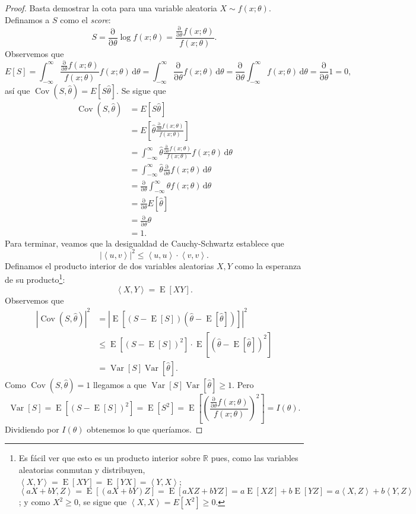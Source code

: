 \documentclass[11pt,letterpaper]{article}
\newcommand{\dif}{\ensuremath{\,\mathrm{d}}}
\newcommand{\pderivative}[2]{\ensuremath{\frac{\mathrm{\partial}#2}{\mathrm{\partial}#1}}}
\newcommand{\dotproduct}[2]{\ensuremath{\left\langle#1,#2\right\rangle}}
\newcommand{\expected}{\ensuremath{\operatorname{E}}}
\newcommand{\variance}{\ensuremath{\operatorname{Var}}}
\newcommand{\covariance}{\ensuremath{\operatorname{Cov}}}
\theoremstyle{definition}
\theoremstyle{theorem}
\theoremstyle{remark}
\begin{document}
	\begin{proof}
		Basta demostrar la cota para una variable aleatoria \(X\sim f(x;\theta)\). Definamos a \(S\) como el \textit{score}:
		\[S=\pderivative{\theta}{}\log f(x;\theta)=\frac{\pderivative{\theta}{}f(x;\theta)}{f(x;\theta)}.\]
		Observemos que
		\[E[S]=\int_{-\infty}^{\infty}\frac{\pderivative{\theta}{}f(x;\theta)}{f(x;\theta)}f(x;\theta)\dif\theta=\int_{-\infty}^{\infty}\pderivative{\theta}{}f(x;\theta)\dif\theta=\pderivative{\theta}{}\int_{-\infty}^{\infty}f(x;\theta)\dif\theta=\pderivative{\theta}{}1=0,\]
		así que \(\covariance(S,\hat{\theta})=E[S\hat{\theta}]\). Se sigue que
		\begin{align*}
			\covariance(S,\hat{\theta})&=E[S\hat{\theta}] \\
			&=E\left[\hat{\theta}\frac{\pderivative{\theta}{}f(x;\theta)}{f(x;\theta)}\right] \\
			&=\int_{-\infty}^{\infty}\hat{\theta}\frac{\pderivative{\theta}{}f(x;\theta)}{f(x;\theta)}f(x;\theta)\dif\theta \\
			&=\int_{-\infty}^{\infty}\hat{\theta}\pderivative{\theta}{}f(x;\theta)\dif\theta \\
			&=\pderivative{\theta}{}\int_{-\infty}^{\infty}\theta f(x;\theta)\dif\theta \\
			&=\pderivative{\theta}{}E[\hat{\theta}] \\
			&=\pderivative{\theta}{}\theta \\
			&=1.
		\end{align*}
		Para terminar, veamos que la desigualdad de Cauchy-Schwartz establece que
		\[|\dotproduct{u}{v}|^2\leq\dotproduct{u}{u}\cdot\dotproduct{v}{v}.\]
		Definamos el producto interior de dos variables aleatorias \(X,Y\) como la esperanza de su producto\footnote{Es fácil ver que esto es un producto interior sobre \(\mathbb{R}\) pues, como las variables aleatorias conmutan y distribuyen, \(\dotproduct{X}{Y}=\expected[XY]=\expected[YX]=\dotproduct{Y}{X}\); \(\dotproduct{aX+bY}{Z}=\expected[(aX+bY)Z]=\expected[aXZ+bYZ]=a\expected[XZ]+b\expected[YZ]=a\dotproduct{X}{Z}+b\dotproduct{Y}{Z}\); y como \(X^2\geq0\), se sigue que \(\dotproduct{X}{X}=E[X^2]\geq0\).}:
		\[\dotproduct{X}{Y}=\expected[XY].\]
		Observemos que
		\begin{align*}
			|\covariance(S,\hat{\theta})|^2&=\left|\expected\left[(S-\expected[S])(\hat{\theta}-\expected[\hat{\theta}])\right]\right|^2 \\
			&\leq\expected\left[(S-\expected[S])^2\right]\cdot\expected\left[(\hat{\theta}-\expected[\hat{\theta}])^2\right] \\
			&=\variance[S]\variance[\hat{\theta}].
		\end{align*}
		Como \(\covariance(S,\hat{\theta})=1\) llegamos a que \(\variance[S]\variance[\hat{\theta}]\geq1\). Pero
		\[\variance[S]=\expected\left[(S-\expected[S])^2\right]=\expected[S^2]=\expected\left[\left(\frac{\pderivative{\theta}{}f(x;\theta)}{f(x;\theta)}\right)^2\right]=I(\theta).\]
		Dividiendo por \(I(\theta)\) obtenemos lo que queríamos.
	\end{proof}
\end{document}
